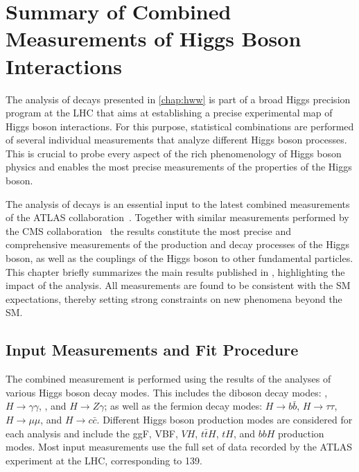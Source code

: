\chapter[Combined Higgs Boson Measurements]{Summary of Combined Measurements of Higgs Boson Interactions}
\label{chap:comb}
The analysis of \HWW decays presented in \cref{chap:hww} is part of a broad Higgs precision program at the LHC that aims at establishing a precise experimental map of Higgs boson interactions.
For this purpose, statistical combinations are performed of several individual measurements that analyze different Higgs boson processes.
This is crucial to probe every aspect of the rich phenomenology of Higgs boson physics and enables the most precise measurements of the properties of the Higgs boson. 

The analysis of \HWW decays is an essential input to the latest combined measurements of the ATLAS collaboration~\cite{NaturePaper}.
Together with similar measurements performed by the CMS collaboration~\cite{CMSNaturePaper} the results constitute the most precise and comprehensive measurements of the production and decay processes of the Higgs boson, as well as the couplings of the Higgs boson to other fundamental particles.
This chapter briefly summarizes the main results published in , highlighting the impact of the \HWW analysis.
All measurements are found to be consistent with the SM expectations, thereby setting strong constraints on new phenomena beyond the SM.  

\section{Input Measurements and Fit Procedure}
The combined measurement is performed using the results of the analyses of various Higgs boson decay modes.
This includes the diboson decay modes: \HZZ, $H \to \gamma\gamma$, \HWW, and $H \to Z\gamma$; as well as the fermion decay modes: $H \to b\bar{b}$, $H \to \tau\tau$, $H \to \mu\mu$, and $H \to c\bar{c}$. 
Different Higgs boson production modes are considered for each analysis and include the ggF, VBF, $VH$, $t\bar{t}H$, $tH$, and $bbH$ production modes. 
Most input measurements use the full set of \RunTwo data recorded by the ATLAS experiment at the LHC, corresponding to 139\ifb.

